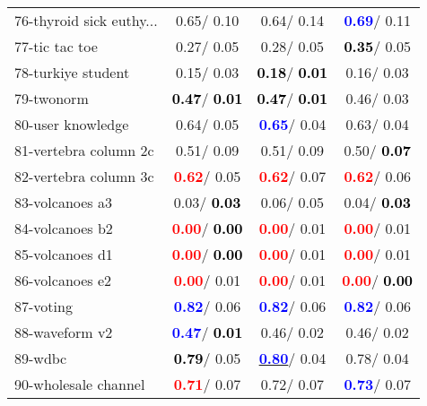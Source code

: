 \begin{table}[h]
\begin{center}
\begin{tabular}{lc|c|c}
76-thyroid sick euthy... &   0.65/  0.10 &   0.64/  0.14 & \textcolor{blue}{\textbf{  0.69}}/  0.11 \\
77-tic tac toe &   0.27/  0.05 &   0.28/  0.05 & \textcolor{black}{\textbf{  0.35}}/  0.05 \\
78-turkiye student &   0.15/  0.03 & \textcolor{black}{\textbf{  0.18}}/\textcolor{black}{\textbf{  0.01}} &   0.16/  0.03 \\ \hline
79-twonorm & \textcolor{black}{\textbf{  0.47}}/\textcolor{black}{\textbf{  0.01}} & \textcolor{black}{\textbf{  0.47}}/\textcolor{black}{\textbf{  0.01}} &   0.46/  0.03 \\
80-user knowledge &   0.64/  0.05 & \textcolor{blue}{\textbf{  0.65}}/  0.04 &   0.63/  0.04 \\
81-vertebra column 2c &   0.51/  0.09 &   0.51/  0.09 &   0.50/\textcolor{black}{\textbf{  0.07}} \\
82-vertebra column 3c & \textcolor{red}{\textbf{  0.62}}/  0.05 & \textcolor{red}{\textbf{  0.62}}/  0.07 & \textcolor{red}{\textbf{  0.62}}/  0.06 \\
83-volcanoes a3 &   0.03/\textcolor{black}{\textbf{  0.03}} &   0.06/  0.05 &   0.04/\textcolor{black}{\textbf{  0.03}} \\
84-volcanoes b2 & \textcolor{red}{\textbf{  0.00}}/\textcolor{black}{\textbf{  0.00}} & \textcolor{red}{\textbf{  0.00}}/  0.01 & \textcolor{red}{\textbf{  0.00}}/  0.01 \\
85-volcanoes d1 & \textcolor{red}{\textbf{  0.00}}/\textcolor{black}{\textbf{  0.00}} & \textcolor{red}{\textbf{  0.00}}/  0.01 & \textcolor{red}{\textbf{  0.00}}/  0.01 \\ \hline
86-volcanoes e2 & \textcolor{red}{\textbf{  0.00}}/  0.01 & \textcolor{red}{\textbf{  0.00}}/  0.01 & \textcolor{red}{\textbf{  0.00}}/\textcolor{black}{\textbf{  0.00}} \\
87-voting & \textcolor{blue}{\textbf{  0.82}}/  0.06 & \textcolor{blue}{\textbf{  0.82}}/  0.06 & \textcolor{blue}{\textbf{  0.82}}/  0.06 \\
88-waveform v2 & \textcolor{blue}{\textbf{  0.47}}/\textcolor{black}{\textbf{  0.01}} &   0.46/  0.02 &   0.46/  0.02 \\
89-wdbc & \textcolor{black}{\textbf{  0.79}}/  0.05 & \underline{\textcolor{blue}{\textbf{  0.80}}}/  0.04 &   0.78/  0.04 \\
90-wholesale channel & \textcolor{red}{\textbf{  0.71}}/  0.07 &   0.72/  0.07 & \textcolor{blue}{\textbf{  0.73}}/  0.07 \\

\end{tabular}
\end{center}
\end{table}
